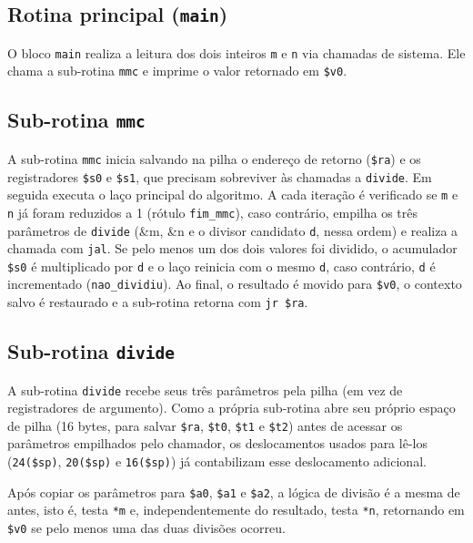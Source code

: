 \subsection{Rotina principal (\texttt{main})}

O bloco \texttt{main} realiza a leitura dos dois inteiros \texttt{m} e \texttt{n} via chamadas de sistema. Ele chama a sub-rotina
\texttt{mmc} e imprime o valor retornado em \texttt{\$v0}.



\subsection{Sub-rotina \texttt{mmc}}

A sub-rotina \texttt{mmc} inicia salvando na pilha o endereço de retorno (\texttt{\$ra}) e os registradores \texttt{\$s0} e
\texttt{\$s1}, que precisam sobreviver às chamadas a \texttt{divide}. 
Em seguida executa o laço principal do
algoritmo. A cada iteração é verificado se \texttt{m} e \texttt{n} já foram reduzidos a 1 (rótulo \texttt{fim\_mmc}),
caso contrário, empilha os três parâmetros de \texttt{divide} (\&m, \&n e o divisor candidato \texttt{d}, nessa ordem) e
realiza a chamada com \texttt{jal}.
Se pelo menos um dos dois valores foi dividido, o acumulador \texttt{\$s0} é multiplicado por \texttt{d} e o laço reinicia com o mesmo \texttt{d}, caso contrário, \texttt{d} é incrementado (\texttt{nao\_dividiu}).
Ao final, o resultado é movido para \texttt{\$v0}, o contexto salvo é restaurado e a sub-rotina retorna com \texttt{jr \$ra}.



\subsection{Sub-rotina \texttt{divide}}

A sub-rotina \texttt{divide} recebe seus três parâmetros pela pilha (em vez de registradores de argumento).
Como a própria sub-rotina abre seu próprio espaço de pilha (16 bytes, para salvar \texttt{\$ra}, \texttt{\$t0}, \texttt{\$t1} e \texttt{\$t2}) antes de acessar os parâmetros empilhados pelo chamador, os deslocamentos usados para lê-los (\texttt{24(\$sp)}, \texttt{20(\$sp)} e \texttt{16(\$sp)}) já contabilizam esse deslocamento adicional.

Após copiar os parâmetros para \texttt{\$a0}, \texttt{\$a1} e \texttt{\$a2}, a lógica de divisão é a mesma de antes, isto é, testa \texttt{*m} e, independentemente do resultado, testa \texttt{*n}, retornando em \texttt{\$v0} se pelo menos uma das duas divisões ocorreu.

